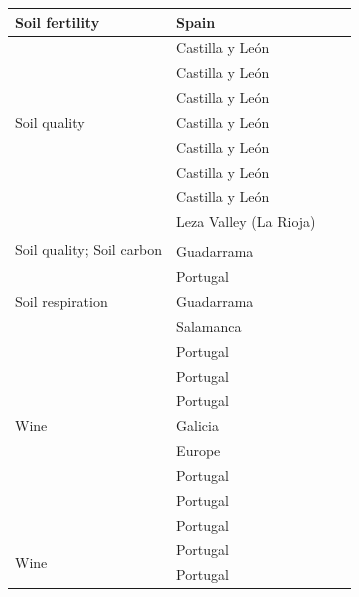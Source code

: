 {\begin{longtable}{llll}
 \midrule
Soil fertility & Spain & \citet{CampoGallardo2012ComparisonCation}\\
\midrule
\multirow{7}{*}{Soil quality} & Castilla y León & \citet{Tarregaetal2009AbandonmentManagement}\\
 & Castilla y León & \citet{Turrionetal2008SoilAvailability}\\
 & Castilla y León & \citet{Menendezetal2007HydrogeochemicalBalance}\\
 & Castilla y León & \citet{Tarregaetal2006ForestStructure}\\
 & Castilla y León & \citet{Schneideretal2001PhosphataseActivity}\\
 & Castilla y León & \citet{Gallardoetal1999NutrientEfficiency}\\
 & Castilla y León & \citet{Martinetal1997LongtermDecomposition}\\
 \midrule
\multirow{4}{*}{Soil quality; Soil carbon} & Leza Valley (La Rioja) & \citet{Lasantaetal2020SoilQuality}\\
 &  & \citet{FernandezGetinoetal2020SoilCarbon}\\
 & Guadarrama  & \citet{FernandezAlonsoetal2018ChangesLitter}\\
& Portugal & \citet{CastroFernandezNunez2014SoilProperties}\\
\midrule
Soil respiration & Guadarrama  & \citet{FernandezAlonsoetal2018DisentanglingEffects}\\
\midrule
\multirow{9}{*}{Wine} & Salamanca  & \citet{MartinezGiletal2020EffectSize}\\
 & Portugal & \citet{Jordaoetal2019InfluenceDifferent}\\
 & Portugal & \citet{McCallumetal2019ChemicalEvaluation}\\
 & Portugal & \citet{DelGaldoetal2019BlendsWood}\\
 & Galicia & \citet{DiazMarotoSylvain2016AnalysisPhysical}\\
 & Europe & \citet{Ghadiriaslietal2018IdentificationOdorous}\\
 & Portugal & \citet{Deliaetal2017InfluenceDifferent}\\
 & Portugal & \citet{Tavaresetal2017ImpactCherry}\\
 & Portugal & \citet{CastroVazquezetal2013StudyPhenolic}\\
\multirow{14}{*}{Wine} & Portugal & \citet{CastroVazquezetal2013EvaluationPortuguese}\\
 & Portugal & \citet{Jordaoetal2012AntioxidantCapacity}\\

\end{longtable}}
